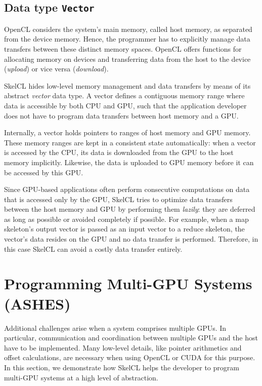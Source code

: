 \subsection{Data type \texttt{Vector}}
\label{sec:skelcl_vector}

OpenCL considers the system's main memory, called host memory, as separated from the device memory.
Hence, the programmer has to explicitly manage data transfers between these distinct memory spaces.
OpenCL offers functions for allocating memory on devices and transferring data from the host to the device (\emph{upload}) or vice versa (\emph{download}).

SkelCL hides low-level memory management and data transfers by means of its abstract \emph{vector} data type.
A vector defines a contiguous memory range where data is accessible by both CPU and GPU, such that the application developer does not have to program data transfers between host memory and a GPU.

Internally, a vector holds pointers to ranges of host memory and GPU memory.
These memory ranges are kept in a consistent state automatically:
when a vector is accessed by the CPU, its data is downloaded from the GPU to the host memory implicitly.
Likewise, the data is uploaded to GPU memory before it can be accessed by this GPU.

Since GPU-based applications often perform consecutive computations on data that is accessed only by the GPU, SkelCL tries to optimize data transfers between the host memory and GPU by performing them \emph{lazily}:
they are deferred as long as possible or avoided completely if possible.
For example, when a map skeleton's output vector is passed as an input vector to a reduce skeleton, the vector's data resides on the GPU and no data transfer is performed.
Therefore, in this case SkelCL can avoid a costly data transfer entirely.

\section{Programming Multi-GPU Systems (ASHES)}

Additional challenges arise when a system comprises multiple GPUs.
In particular, communication and coordination between multiple GPUs and the host have to be implemented.
Many low-level details, like pointer arithmetics and offset calculations, are necessary when using OpenCL or CUDA for this purpose.
In this section, we demonstrate how SkelCL helps the developer to program multi-GPU systems at a high level of abstraction.

